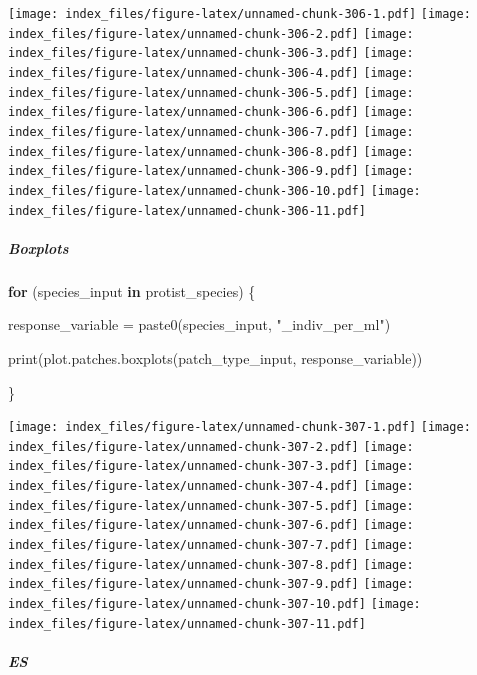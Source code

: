 \documentclass[
]{article}
\newenvironment{Shaded}{\begin{snugshade}}{\end{snugshade}}
\newcommand{\ControlFlowTok}[1]{\textcolor[rgb]{0.13,0.29,0.53}{\textbf{#1}}}
\newcommand{\FunctionTok}[1]{\textcolor[rgb]{0.00,0.00,0.00}{#1}}
\newcommand{\NormalTok}[1]{#1}
\newcommand{\OtherTok}[1]{\textcolor[rgb]{0.56,0.35,0.01}{#1}}
\newcommand{\StringTok}[1]{\textcolor[rgb]{0.31,0.60,0.02}{#1}}
\begin{document}
\texttt{[image: index\_files/figure-latex/unnamed-chunk-306-1.pdf]}
\texttt{[image: index\_files/figure-latex/unnamed-chunk-306-2.pdf]}
\texttt{[image: index\_files/figure-latex/unnamed-chunk-306-3.pdf]}
\texttt{[image: index\_files/figure-latex/unnamed-chunk-306-4.pdf]}
\texttt{[image: index\_files/figure-latex/unnamed-chunk-306-5.pdf]}
\texttt{[image: index\_files/figure-latex/unnamed-chunk-306-6.pdf]}
\texttt{[image: index\_files/figure-latex/unnamed-chunk-306-7.pdf]}
\texttt{[image: index\_files/figure-latex/unnamed-chunk-306-8.pdf]}
\texttt{[image: index\_files/figure-latex/unnamed-chunk-306-9.pdf]}
\texttt{[image: index\_files/figure-latex/unnamed-chunk-306-10.pdf]}
\texttt{[image: index\_files/figure-latex/unnamed-chunk-306-11.pdf]}

\hypertarget{boxplots-19}{%
\subparagraph{Boxplots}\label{boxplots-19}}

\begin{Shaded}
\begin{Highlighting}[]
\ControlFlowTok{for}\NormalTok{ (species\_input }\ControlFlowTok{in}\NormalTok{ protist\_species) \{}
  
\NormalTok{  response\_variable }\OtherTok{=} \FunctionTok{paste0}\NormalTok{(species\_input, }\StringTok{"\_indiv\_per\_ml"}\NormalTok{)}
  
  \FunctionTok{print}\NormalTok{(}\FunctionTok{plot.patches.boxplots}\NormalTok{(patch\_type\_input,}
\NormalTok{                              response\_variable))}
  
\NormalTok{\}}
\end{Highlighting}
\end{Shaded}

\texttt{[image: index\_files/figure-latex/unnamed-chunk-307-1.pdf]}
\texttt{[image: index\_files/figure-latex/unnamed-chunk-307-2.pdf]}
\texttt{[image: index\_files/figure-latex/unnamed-chunk-307-3.pdf]}
\texttt{[image: index\_files/figure-latex/unnamed-chunk-307-4.pdf]}
\texttt{[image: index\_files/figure-latex/unnamed-chunk-307-5.pdf]}
\texttt{[image: index\_files/figure-latex/unnamed-chunk-307-6.pdf]}
\texttt{[image: index\_files/figure-latex/unnamed-chunk-307-7.pdf]}
\texttt{[image: index\_files/figure-latex/unnamed-chunk-307-8.pdf]}
\texttt{[image: index\_files/figure-latex/unnamed-chunk-307-9.pdf]}
\texttt{[image: index\_files/figure-latex/unnamed-chunk-307-10.pdf]}
\texttt{[image: index\_files/figure-latex/unnamed-chunk-307-11.pdf]}

\hypertarget{es-4}{%
\subparagraph{ES}\label{es-4}}
\end{document}
